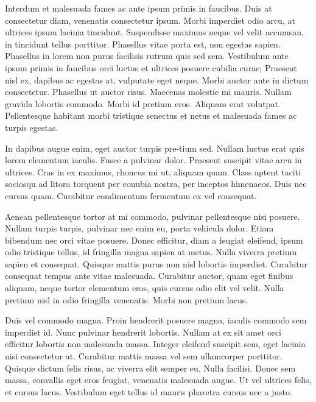 Interdum et malesuada fames ac ante ipsum primis in faucibus. Duis at consectetur diam, venenatis consectetur ipsum. Morbi imperdiet odio arcu, at ultrices ipsum lacinia tincidunt. Suspendisse maximus neque vel velit accumsan, in tincidunt tellus porttitor. Phasellus vitae porta est, non egestas sapien. Phasellus in lorem non purus facilisis rutrum quis sed sem. Vestibulum ante ipsum primis in faucibus orci luctus et ultrices posuere cubilia curae; Praesent nisl ex, dapibus ac egestas at, vulputate eget neque. Morbi auctor ante in dictum consectetur. Phasellus ut auctor risus. Maecenas molestie mi mauris. Nullam gravida lobortis commodo. Morbi id pretium eros. Aliquam erat volutpat. Pellentesque habitant morbi tristique senectus et netus et malesuada fames ac turpis egestas.

In dapibus augue enim, eget auctor turpis pre-tium sed. Nullam luctus erat quis lorem elementum iaculis. Fusce a pulvinar dolor. Praesent suscipit vitae arcu in ultrices. Cras in ex maximus, rhoncus mi ut, aliquam quam. Class aptent taciti sociosqu ad litora torquent per conubia nostra, per inceptos himenaeos. Duis nec cursus quam. Curabitur condimentum fermentum ex vel consequat.

Aenean pellentesque tortor at mi commodo, pulvinar pellentesque nisi posuere. Nullam turpis turpis, pulvinar nec enim eu, porta vehicula dolor. Etiam bibendum nec orci vitae posuere. Donec efficitur, diam a feugiat eleifend, ipsum odio tristique tellus, id fringilla magna sapien at metus. Nulla viverra pretium sapien et consequat. Quisque mattis purus non nisl lobortis imperdiet. Curabitur consequat tempus ante vitae malesuada. Curabitur auctor, quam eget finibus aliquam, neque tortor elementum eros, quis cursus odio elit vel velit. Nulla pretium nisl in odio fringilla venenatis. Morbi non pretium lacus.

Duis vel commodo magna. Proin hendrerit posuere magna, iaculis commodo sem imperdiet id. Nunc pulvinar hendrerit lobortis. Nullam at ex sit amet orci efficitur lobortis non malesuada massa. Integer eleifend suscipit sem, eget lacinia nisi consectetur at. Curabitur mattis massa vel sem ullamcorper porttitor. Quisque dictum felis risus, ac viverra elit semper eu. Nulla facilisi. Donec sem massa, convallis eget eros feugiat, venenatis malesuada augue. Ut vel ultrices felis, et cursus lacus. Vestibulum eget tellus id mauris pharetra cursus nec a justo.

